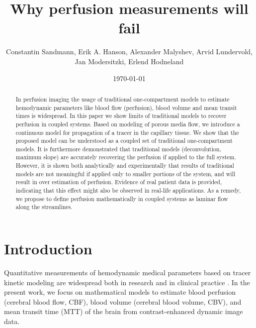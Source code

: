 \documentclass[journal,twocolumn]{IEEEtran}
\title{Why perfusion measurements will fail}
\author{Constantin Sandmann, Erik A. Hanson, Alexander Malyshev,  Arvid Lundervold, Jan Modersitzki, Erlend Hodneland }
\date{\today}
\begin{document}
	\maketitle

	\begin{abstract}
		In perfusion imaging the usage of traditional one-compartment models to estimate hemodynamic parameters like blood flow (perfusion), blood volume and mean transit times is widespread. In this paper we show limits of traditional models to recover perfusion in coupled systems. Based on modeling of porous media flow, we introduce a continuous model for propagation of a tracer in the capillary tissue. We show that the proposed model can be understood as a coupled set of traditional one-compartment models. It is furthermore demonstrated that traditional models (deconvolution, maximum slope) are accurately recovering the perfusion if applied to the full system. However, it is shown both analytically and experimentally that results of traditional models are not meaningful if applied only to smaller portions of the system, and will result in over estimation of perfusion. Evidence of real patient data is provided, indicating that this effect might also be observed in real-life applications.  As a remedy, we propose to define perfusion mathematically in coupled systems as laminar flow along the streamlines.
	\end{abstract}

	\section{Introduction}
	
	Quantitative measurements of hemodynamic medical parameters based on tracer kinetic modeling are widespread both in research and in clinical practice \cite{sourbron13}. 
	In the present work, we focus on mathematical models to estimate blood perfusion (cerebral blood flow, CBF), blood volume (cerebral blood volume, CBV), and mean transit time (MTT) of the brain from contrast-enhanced dynamic image data. 
\end{document}
